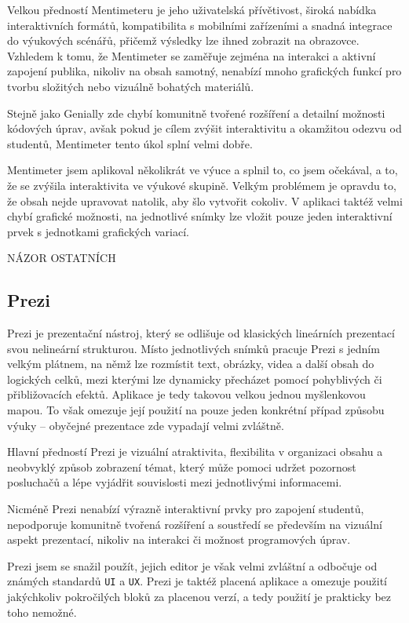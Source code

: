 Velkou předností Mentimeteru je jeho uživatelská přívětivost, široká nabídka interaktivních formátů, kompatibilita s mobilními zařízeními a snadná integrace do výukových scénářů, přičemž výsledky lze ihned zobrazit na obrazovce. 
Vzhledem k tomu, že Mentimeter se zaměřuje zejména na interakci a aktivní zapojení publika, nikoliv na obsah samotný, nenabízí mnoho grafických funkcí pro tvorbu složitých nebo vizuálně bohatých materiálů. 

Stejně jako Genially zde chybí komunitně tvořené rozšíření a detailní možnosti kódových úprav, avšak pokud je cílem zvýšit interaktivitu a okamžitou odezvu od studentů, Mentimeter tento úkol splní velmi dobře.

Mentimeter jsem aplikoval několikrát ve výuce a splnil to, co jsem očekával, a to, že se zvýšila interaktivita ve výukové skupině. 
Velkým problémem je opravdu to, že obsah nejde upravovat natolik, aby šlo vytvořit cokoliv. 
V aplikaci taktéž velmi chybí grafické možnosti, na jednotlivé snímky lze vložit pouze jeden interaktivní prvek s jednotkami grafických variací.

NÁZOR OSTATNÍCH

\subsection{Prezi}

Prezi je prezentační nástroj, který se odlišuje od klasických lineárních prezentací svou nelineární strukturou.
Místo jednotlivých snímků pracuje Prezi s jedním velkým plátnem, na němž lze rozmístit text, obrázky, videa a další obsah do logických celků, mezi kterými lze dynamicky přecházet pomocí pohyblivých či přibližovacích efektů.
Aplikace je tedy takovou velkou jednou myšlenkovou mapou.
To však omezuje její použití na pouze jeden konkrétní případ způsobu výuky -- obyčejné prezentace zde vypadají velmi zvláštně.

Hlavní předností Prezi je vizuální atraktivita, flexibilita v organizaci obsahu a neobvyklý způsob zobrazení témat, který může pomoci udržet pozornost posluchačů a lépe vyjádřit souvislosti mezi jednotlivými informacemi. 

Nicméně Prezi nenabízí výrazně interaktivní prvky pro zapojení studentů, nepodporuje komunitně tvořená rozšíření a soustředí se především na vizuální aspekt prezentací, nikoliv na interakci či možnost programových úprav.

Prezi jsem se snažil použít, jejich editor je však velmi zvláštní a odbočuje od známých standardů \texttt{UI} a \texttt{UX}.
Prezi je taktéž placená aplikace a omezuje použití jakýchkoliv pokročilých bloků za placenou verzí, a tedy použití je prakticky bez toho nemožné.

